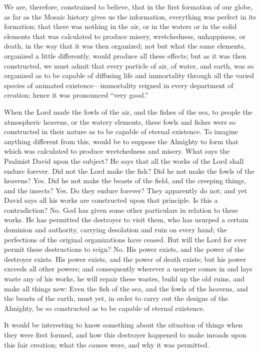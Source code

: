 We are, therefore, constrained to believe, that in the first formation of our globe, as far as the
Mosaic history gives us the information, everything was perfect in its formation; that there
was nothing in the air, or in the waters or in the solid elements that was calculated to produce
misery, wretchedness, unhappiness, or death, in the way that it was then organized; not but
what the same elements, organized a little differently, would produce all these effects; but as
it was then constructed, we must admit that every particle of air, of water, and earth, was so
organized as to be capable of diffusing life and immortality through all the varied species of
animated existence—immortality reigned in every department of creation; hence it was
pronounced ``very good.''

When the Lord made the fowls of the air, and the fishes of the sea, to people the atmospheric
heavens, or the watery elements, these fowls and fishes were so constructed in their nature as
to be capable of eternal existence. To imagine anything different from this, would be to
suppose the Almighty to form that which was calculated to produce wretchedness and
misery. What says the Psalmist David upon the subject? He says that all the works of the
Lord shall endure forever. Did not the Lord make the fish? Did he not make the fowls of the
heavens? Yes. Did he not make the beasts of the field, and the creeping things, and the
insects? Yes. Do they endure forever? They apparently do not; and yet David says all his
works are constructed upon that principle. Is this a contradiction? No. God has given some
other particulars in relation to these works. He has permitted the destroyer to visit them, who
has usurped a certain dominion and authority, carrying desolation and ruin on every hand; the
perfections of the original organizations have ceased. But will the Lord for ever permit these
destructions to reign? No. His power exists, and the power of the destroyer exists. His power
exists, and the power of death exists; but his power exceeds all other powers; and
consequently wherever a usurper comes in and lays waste any of his works, he will repair
these wastes, build up the old ruins, and make all things new: Even the fish of the sea, and
the fowls of the heavens, and the beasts of the earth, must yet, in order to carry out the
designs of the Almighty, be so constructed as to be capable of eternal existence.

It would be interesting to know something about the situation of things when they were first
formed, and how this destroyer happened to make inroads upon this fair creation; what the
causes were, and why it was permitted.


